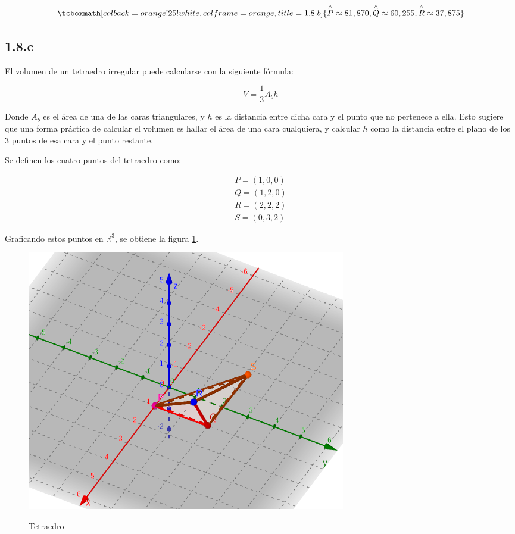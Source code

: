 \documentclass{article}
\renewcommand{\Bbb}{\mathbb}
\begin{document}
\begin{equation}
\tcboxmath[colback=orange!25!white,colframe=orange, title=1.8.b]
{ \overset{\wedge}{P} \approx 81,870, \overset{\wedge}{Q} \approx 60,255, \overset{\wedge}{R} \approx 37,875 }
\end{equation}

\subsection*{1.8.c}
\label{subsec:1.8.c}

El volumen de un tetraedro irregular puede calcularse con la siguiente fórmula:

\begin{equation}
V = \frac{1}{3} A_b h \label{eq:voltetr}
\end{equation}

Donde $A_b$ es el área de una de las caras triangulares, y $h$ es la distancia entre dicha cara y el punto que no pertenece a ella. Esto sugiere que una forma práctica de calcular el volumen es hallar el área de una cara cualquiera, y calcular $h$ como la distancia entre el plano de los 3 puntos de esa cara y el punto restante.

Se definen los cuatro puntos del tetraedro como:

\begin{align}
P = (1, 0, 0) \\
Q = (1, 2, 0) \\
R = (2, 2, 2) \\
S = (0, 3, 2)
\end{align}

Graficando estos puntos en $\Bbb R^3$, se obtiene la figura \ref{fig:1-8-c}.

\begin{figure}[ht]
\caption{Tetraedro}
\includegraphics[scale=0.6]{../img/exercises/guide_01/08_c.png} 
\centering
\label{fig:1-8-c}
\end{figure}
\end{document}
